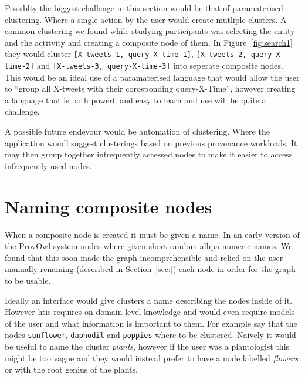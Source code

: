 Possiblty the biggest challenge in this section would be that of paramaterised clustering. Where a single action by the user would create mutliple clusters. A common clustering we found while studying participants was selecting the entity and the actitvity and creating a composite node of them. In Figure~\ref{fig:search1} they would cluster \texttt{[X-tweets-1, query-X-time-1]}, \texttt{[X-tweets-2, query-X-time-2]} and \texttt{[X-tweets-3, query-X-time-3]} into seperate composite nodes. This would be an ideal use of a paramaterised language that would allow the user to ``group all X-tweets with their corosponding query-X-Time'', however creating a language that is both powerfl and easy to learn and use will be quite a challenge.

A possible future endevour would be automation of clustering. Where the application woudl suggest clusterings based on previous provenance workloads. It may then group together infrequently accessed nodes to make it easier to access infrequently used nodes.

\section{Naming composite nodes}
\label{sec:naming_composite_nodes}

When a composite node is created it must be given a name. In an early version of the ProvOwl system nodes where given short random alhpa-numeric names. We found that this soon made the graph incomprehensible and relied on the user manually 
renaming (described in Section~\ref{sec:}) each node in order for the graph to be usable. 

Ideally an interface would give clusters a name describing the nodes inside of it. However htis requires on domain level knowledge and would even require models of the user and what information is important to them. For example say that the nodes \texttt{sunflower}, \texttt{daphodil} and \texttt{poppies} where to be clustered. Naively it would be useful to name the cluster \textit{plants}, however if the user was a plantologist
this might be too vague and they would instead prefer to have a node labelled \textit{flowers} or with the root genius of the plants. 

